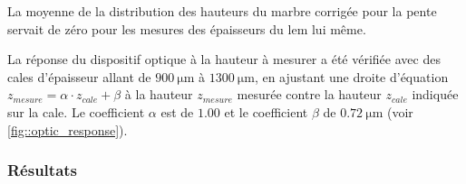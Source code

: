                     La moyenne de la distribution des hauteurs du marbre corrigée pour la pente servait de zéro pour les mesures des épaisseurs du \gls{lem} lui même.
                    
                    La réponse du dispositif optique à la hauteur à mesurer a été vérifiée avec des cales d'épaisseur allant de $\SI{900}{\micro\meter}$ à $\SI{1300}{\micro\meter}$, en ajustant une droite d'équation $z_{mesure} = \alpha \cdot z_{cale} + \beta$ à la hauteur $z_{mesure}$ mesurée contre la hauteur $z_{cale}$ indiquée sur la cale. Le coefficient $\alpha$ est de $1.00$ et le coefficient $\beta$ de $\SI{0.72}{\micro\meter}$ (voir \autoref{fig::optic_response}).
                    
                    
                    
            \subsubsection{Résultats}\label{sec::thickness_result}
                

